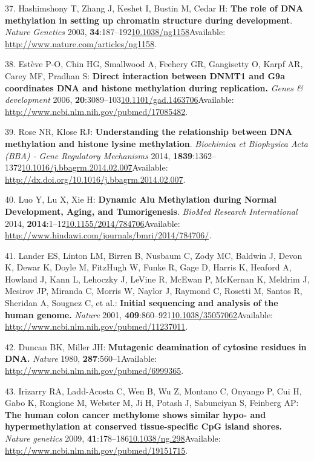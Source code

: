 \documentclass[
]{book}
\begin{document}
\leavevmode\hypertarget{ref-Hashimshony2003}{}%
37. Hashimshony T, Zhang J, Keshet I, Bustin M, Cedar H: \textbf{The role of DNA methylation in setting up chromatin structure during development}. \emph{Nature Genetics} 2003, \textbf{34}:187--192\href{https://doi.org/10.1038/ng1158}{10.1038/ng1158}Available: \url{http://www.nature.com/articles/ng1158}.

\leavevmode\hypertarget{ref-Esteve2006}{}%
38. Estève P-O, Chin HG, Smallwood A, Feehery GR, Gangisetty O, Karpf AR, Carey MF, Pradhan S: \textbf{Direct interaction between DNMT1 and G9a coordinates DNA and histone methylation during replication.} \emph{Genes \& development} 2006, \textbf{20}:3089--103\href{https://doi.org/10.1101/gad.1463706}{10.1101/gad.1463706}Available: \url{http://www.ncbi.nlm.nih.gov/pubmed/17085482}.

\leavevmode\hypertarget{ref-Rose2014}{}%
39. Rose NR, Klose RJ: \textbf{Understanding the relationship between DNA methylation and histone lysine methylation}. \emph{Biochimica et Biophysica Acta (BBA) - Gene Regulatory Mechanisms} 2014, \textbf{1839}:1362--1372\href{https://doi.org/10.1016/j.bbagrm.2014.02.007}{10.1016/j.bbagrm.2014.02.007}Available: \url{http://dx.doi.org/10.1016/j.bbagrm.2014.02.007}.

\leavevmode\hypertarget{ref-Luo2014}{}%
40. Luo Y, Lu X, Xie H: \textbf{Dynamic Alu Methylation during Normal Development, Aging, and Tumorigenesis}. \emph{BioMed Research International} 2014, \textbf{2014}:1--12\href{https://doi.org/10.1155/2014/784706}{10.1155/2014/784706}Available: \url{http://www.hindawi.com/journals/bmri/2014/784706/}.

\leavevmode\hypertarget{ref-Lander2001}{}%
41. Lander ES, Linton LM, Birren B, Nusbaum C, Zody MC, Baldwin J, Devon K, Dewar K, Doyle M, FitzHugh W, Funke R, Gage D, Harris K, Heaford A, Howland J, Kann L, Lehoczky J, LeVine R, McEwan P, McKernan K, Meldrim J, Mesirov JP, Miranda C, Morris W, Naylor J, Raymond C, Rosetti M, Santos R, Sheridan A, Sougnez C, et al.: \textbf{Initial sequencing and analysis of the human genome.} \emph{Nature} 2001, \textbf{409}:860--921\href{https://doi.org/10.1038/35057062}{10.1038/35057062}Available: \url{http://www.ncbi.nlm.nih.gov/pubmed/11237011}.

\leavevmode\hypertarget{ref-Duncan1980}{}%
42. Duncan BK, Miller JH: \textbf{Mutagenic deamination of cytosine residues in DNA.} \emph{Nature} 1980, \textbf{287}:560--1Available: \url{http://www.ncbi.nlm.nih.gov/pubmed/6999365}.

\leavevmode\hypertarget{ref-Irizarry2009}{}%
43. Irizarry RA, Ladd-Acosta C, Wen B, Wu Z, Montano C, Onyango P, Cui H, Gabo K, Rongione M, Webster M, Ji H, Potash J, Sabunciyan S, Feinberg AP: \textbf{The human colon cancer methylome shows similar hypo- and hypermethylation at conserved tissue-specific CpG island shores.} \emph{Nature genetics} 2009, \textbf{41}:178--186\href{https://doi.org/10.1038/ng.298}{10.1038/ng.298}Available: \url{http://www.ncbi.nlm.nih.gov/pubmed/19151715}.
\end{document}
